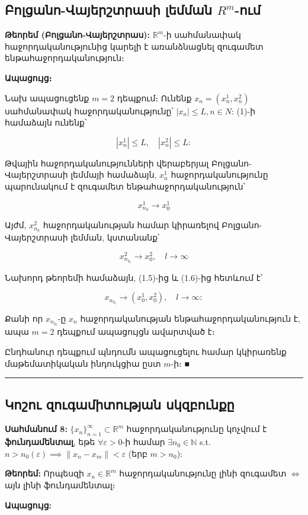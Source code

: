 \documentclass[12pt, a4paper]{article}
\begin{document}
\subsection{Բոլցանո-Վայերշտրասի լեմման $R^m$-ում}

\textbf{Թեորեմ (Բոլցանո-Վայերշտրաս):} $\mathbb{R}^m$-ի սահմանափակ հաջորդականությունից կարելի է առանձնացնել զուգամետ ենթահաջորդականություն։

\textbf{Ապացույց։}

Նախ ապացուցենք $m=2$ դեպքում։ Ունենք $x_n = (x_n^1, x_n^2)$ սահմանափակ հաջորդականությունը՝ $|x_n| \leq L, n \in N$: (1)-ի համաձայն ունենք՝

$$|x_n^1| \leq L, \quad |x_n^2| \leq L :$$

Թվային հաջորդականությունների վերաբերյալ Բոլցանո-Վայերշտրասի լեմմայի համաձայն, $x_n^1$ հաջորդականությունը պարունակում է զուգամետ ենթահաջորդականություն՝

$$x_{n_k}^1 \to x_0^1 \tag{1.5}$$

Այժմ, $x_{n_k}^2$ հաջորդականության համար կիրառելով Բոլցանո-Վայերշտրասի լեմման, կստանանք՝

$$x_{n_{k_l}}^2 \to x_0^2, \quad l \to \infty \tag{1.6}$$

Նախորդ թեորեմի համաձայն, (1.5)-ից և (1.6)-ից հետևում է՝

$$x_{n_{k_l}} \to (x_0^1, x_0^2), \quad l \to \infty :$$

Քանի որ $x_{n_{k_l}}$-ը $x_n$ հաջորդականության ենթահաջորդականություն է, ապա $m=2$ դեպքում ապացույցն ավարտված է։

Ընդհանուր դեպքում պնդումն ապացուցելու համար կկիրառենք մաթեմատիկական ինդուկցիա ըստ $m$-ի։ ■

\vspace{1em}
\hrule
\vspace{1em}

\subsection{Կոշու զուգամիտության սկզբունքը}

\textbf{Սահմանում 8:} $\{x_n\}_{n=1}^\infty \subset \mathbb{R}^m$ հաջորդականությունը կոչվում է \textbf{ֆունդամենտալ}, եթե $\forall \varepsilon > 0$-ի համար $\exists n_0 \in \mathbb{N}$ s.t. $n > n_0(\varepsilon) \implies \|x_n - x_m\| < \varepsilon$ (երբ $m > n_0$):

\textbf{Թեորեմ:} Որպեսզի $x_n \in \mathbb{R}^m$ հաջորդականությունը լինի զուգամետ $\iff$ այն լինի ֆունդամենտալ։

\textbf{Ապացույց:}
\end{document}
